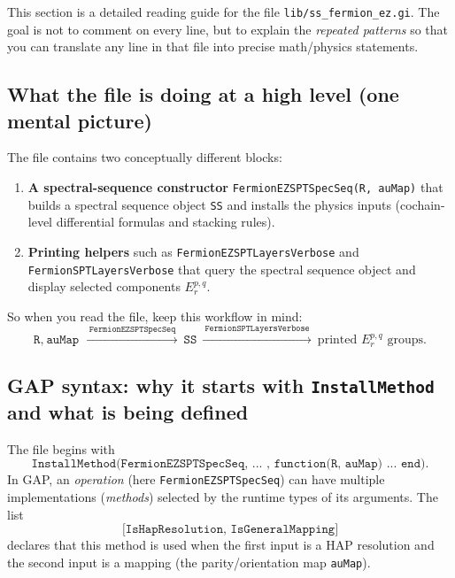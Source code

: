 \documentclass{SciPost}
\begin{document}
This section is a detailed reading guide for the file \texttt{lib/ss\_fermion\_ez.gi}.
The goal is not to comment on every line, but to explain the \emph{repeated patterns} so that you can translate any line in that file into precise math/physics statements.

\subsection{What the file is doing at a high level (one mental picture)}

The file contains two conceptually different blocks:
\begin{enumerate}
    \item \textbf{A spectral-sequence constructor} \texttt{FermionEZSPTSpecSeq(R, auMap)} that builds a spectral sequence object \texttt{SS} and installs the physics inputs (cochain-level differential formulas and stacking rules).
    \item \textbf{Printing helpers} such as \texttt{FermionEZSPTLayersVerbose} and \texttt{FermionSPTLayersVerbose} that query the spectral sequence object and display selected components $E_r^{p,q}$.
\end{enumerate}

So when you read the file, keep this workflow in mind:
\begin{equation}
\boxed{\texttt{R},\ \texttt{auMap}}\ \xrightarrow{\ \texttt{FermionEZSPTSpecSeq}\ }\ \boxed{\texttt{SS}}\ \xrightarrow{\ \texttt{FermionSPTLayersVerbose}\ }\ \boxed{\text{printed }E_r^{p,q}\text{ groups}}.
\end{equation}

\subsection{GAP syntax: why it starts with \texttt{InstallMethod} and what is being defined}

The file begins with
\begin{equation}
	\texttt{InstallMethod(FermionEZSPTSpecSeq, ... , function(R, auMap) ... end)}.
\end{equation}
In GAP, an \emph{operation} (here \texttt{FermionEZSPTSpecSeq}) can have multiple implementations (\emph{methods}) selected by the runtime types of its arguments.
The list
\begin{equation}
	\texttt{[IsHapResolution, IsGeneralMapping]}
\end{equation}
declares that this method is used when the first input is a HAP resolution and the second input is a mapping (the parity/orientation map \texttt{auMap}).
\end{document}
